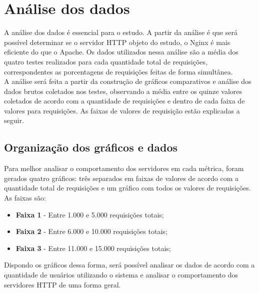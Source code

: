 \chapter{Análise dos dados}\label{cap:analise-dos-dados}
A análise dos dados é essencial para o estudo. A partir da análise é que 
será possível determinar se o servidor HTTP objeto do estudo, o Nginx é mais 
eficiente do que o Apache. Os dados utilizados nessa análise são a média dos 
quatro testes realizados para cada quantidade total de requisições, 
correspondentes as porcentagens de requisições feitas de forma simultânea.\\
A análise será feita a partir da construção de gráficos comparativos e análise 
dos dados brutos coletados nos testes, observando a média 
entre os quinze valores coletados de acordo com a quantidade de requisições e 
dentro de cada faixa de valores para requisições. As faixas de valores de 
requisição estão explicadas a seguir.
\section{Organização dos gráficos e dados}
Para melhor analisar o comportamento dos servidores em cada métrica, foram 
gerados quatro gráficos: três separados em faixas de valores de acordo com a 
quantidade total de requisições e um gráfico com todos os valores 
de requisições. As faixas são:
\begin{itemize}
	\item \textbf{Faixa 1} - Entre 1.000 e 5.000 requisições totais;
	\item \textbf{Faixa 2} - Entre 6.000 e 10.000 requisições totais;
	\item \textbf{Faixa 3} - Entre 11.000 e 15.000 requisições totais;
\end{itemize}
Dispondo os gráficos dessa forma, será possível analisar os dados de acordo com 
a quantidade de usuários utilizando o sistema e analisar o comportamento dos 
servidores HTTP de uma forma geral.


%
